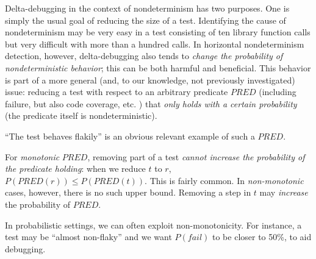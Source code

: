 Delta-debugging in the context of nondeterminism has two
purposes.  One is simply the usual goal of reducing the size of a
test.  Identifying the cause of nondeterminism may be very easy in a
test consisting of ten library function calls but very difficult with
more than a hundred calls.  In horizontal nondeterminism detection, however,
delta-debugging also tends to \emph{change the probability of
  nondeterministic behavior}; this can be both harmful and
beneficial.  This behavior is part of a more general (and, to our
knowledge, not previously investigated) issue: reducing a test with
respect to an arbitrary predicate $\mathit{PRED}$ (including failure,
but also code coverage, etc. \cite{icst2014,stvrcausereduce,NonAdeq}) that \emph{only holds with a
certain probability} (the predicate itself is nondeterministic).

``The test behaves flakily'' is an obvious relevant example of such a $\mathit{PRED}$.

For \emph{monotonic} $\mathit{PRED}$, removing part of a test \emph{cannot
increase the probability of the predicate holding}: when we reduce $t$
to $r$, $P(\mathit{PRED}(r)) \leq P(\mathit{PRED}(t))$.  This is fairly
common.  In \emph{non-monotonic} cases,
however, there is no such upper bound.  Removing a step in $t$ may
\emph{increase} the probability of $\mathit{PRED}$.

In probabilistic
settings, we can often exploit non-monotonicity.  For instance, a test may be
``almost non-flaky'' and we want $P(\mathit{fail})$ to be closer to
50\%, to aid debugging.

